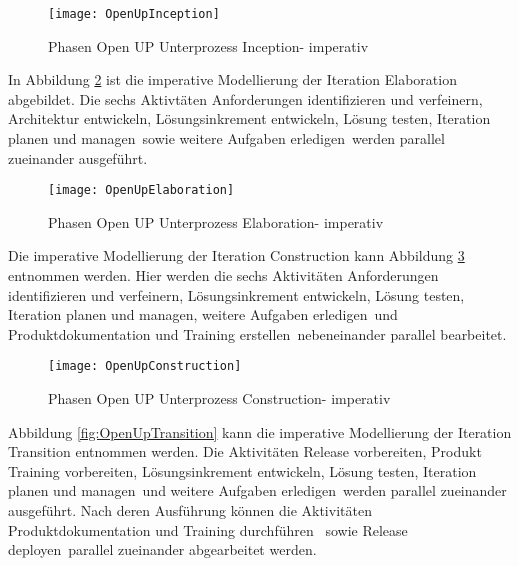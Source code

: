 \begin{figure}[htp]
\begin{center}
  \texttt{[image: OpenUpInception]} %
  \caption{Phasen Open UP Unterprozess Inception- imperativ}
  \label{fig:OpenUpInception}
\end{center}
\end{figure}

In Abbildung \ref{fig:OpenUpElaboration} ist die imperative Modellierung der Iteration Elaboration abgebildet. Die sechs Aktivtäten \grqq Anforderungen identifizieren und verfeinern\grqq , \grqq Architektur entwickeln\grqq, \grqq Lösungsinkrement entwickeln\grqq, \grqq Lösung testen\grqq, \grqq Iteration planen und managen\grqq \ sowie \grqq weitere Aufgaben erledigen\grqq \ werden parallel zueinander ausgeführt.

\begin{figure}[htp]
\begin{center}
  \texttt{[image: OpenUpElaboration]} %
  \caption{Phasen Open UP Unterprozess Elaboration- imperativ}
  \label{fig:OpenUpElaboration}
\end{center}
\end{figure}

Die imperative Modellierung der Iteration Construction kann Abbildung \ref{fig:OpenUpConstruction} entnommen werden. Hier werden die sechs Aktivitäten \grqq Anforderungen identifizieren und verfeinern\grqq, \grqq Lösungsinkrement entwickeln\grqq , \grqq Lösung testen\grqq , \grqq Iteration planen und managen\grqq , \grqq weitere Aufgaben erledigen\grqq  \ und \grqq Produktdokumentation und Training erstellen\grqq \ nebeneinander parallel bearbeitet.
\begin{figure}[htp]
\begin{center}
  \texttt{[image: OpenUpConstruction]} %
  \caption{Phasen Open UP Unterprozess Construction- imperativ}
  \label{fig:OpenUpConstruction}
\end{center}
\end{figure}

Abbildung \ref{fig:OpenUpTransition} kann die imperative Modellierung der Iteration Transition entnommen werden. Die Aktivitäten \grqq Release vorbereiten\grqq, \grqq  Produkt Training vorbereiten\grqq, \grqq Lösungsinkrement entwickeln\grqq, \grqq Lösung testen\grqq , \grqq Iteration planen und managen\grqq \ und \grqq weitere Aufgaben erledigen\grqq \ werden parallel zueinander ausgeführt. Nach deren Ausführung können die Aktivitäten Produktdokumentation und Training durchführen \grqq \ sowie \grqq Release deployen\grqq \  parallel zueinander abgearbeitet werden.

